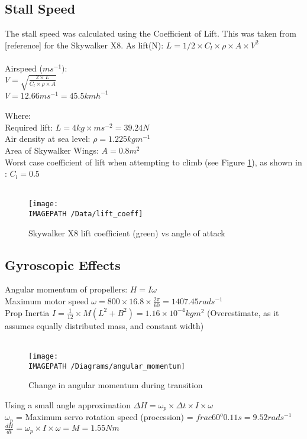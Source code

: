 \subsection{Stall Speed}
\label{sec:stall}
The stall speed was calculated using the Coefficient of Lift. This was taken from [reference] for the Skywalker X8.
As lift(N): $L = 1/2\times C_l\times\rho\times A\times V^2$\\\\
Airspeed ($ms^{-1})$:\\
$V= \sqrt{\frac{2\times L}{C_l\times \rho \times A}}$\\
$V = 12.66ms^{-1} = 45.5kmh^{-1}$\\\\
Where:\\
Required lift: $L = 4kg \times ms^{-2} = 39.24N$\\
Air density at sea level: $\rho = 1.225 kgm^{-1}$\\
Area of Skywalker Wings: $A = 0.8m^2$\\
Worst case coefficient of lift when attempting to climb (see Figure \ref{fig:lift}), as shown in \cite{ref:x8aerodynamics}: $C_l = 0.5$
\\\\
\begin{figure}[!ht]
	\centering
	\texttt{[image: \\IMAGEPATH /Data/lift\_coeff]}
	\caption{Skywalker X8 lift coefficient (green) vs angle of attack}
	\label{fig:lift}
\end{figure}

\subsection{Gyroscopic Effects}
\label{sec:gyro}
Angular momentum of propellers: $H = I\omega$\\
Maximum motor speed $\omega = 800\times16.8\times\frac{2\pi}{60} = 1407.45rads^{-1}$\\
Prop Inertia $I = \frac{1}{12}\times M(L^2+B^2) = 1.16\times10^{-4}kgm^2$ (Overestimate, as it assumes equally distributed mass, and constant width)\\\\

\begin{figure}[!ht]
	\centering
	\texttt{[image: \\IMAGEPATH /Diagrams/angular\_momentum]}
	\caption{Change in angular momentum during transition}
	\label{fig:momentum}
\end{figure}

Using a small angle approximation $\Delta H = \omega_p \times\Delta t \times I \times \omega$\\ 
$\omega_p$ = Maximum servo rotation speed (procession) = $frac{60^o}{0.11s} = 9.52rads^{-1}$\\
$\frac{dH}{dt} = \omega_p \times I \times \omega = M = 1.55Nm$\\\\

